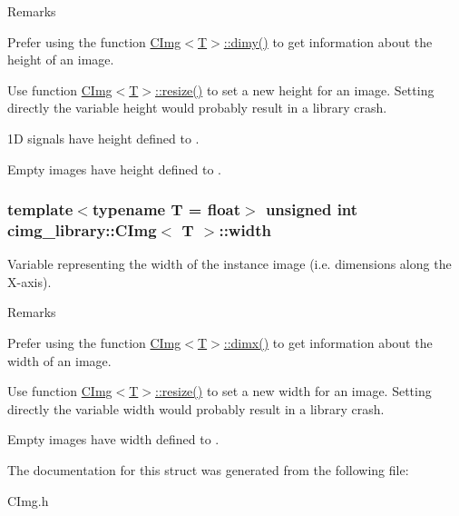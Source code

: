 \begin{DoxyRemark}{Remarks}

\begin{DoxyItemize}
\item Prefer using the function \hyperlink{structcimg__library_1_1_c_img_aa1e128f9d950b39ed312eb368741970c}{C\-Img$<$\-T$>$\-::dimy()} to get information about the height of an image.
\item Use function \hyperlink{structcimg__library_1_1_c_img_a84970d569f01fc5f9370d9cc84428903}{C\-Img$<$\-T$>$\-::resize()} to set a new height for an image. Setting directly the variable {\ttfamily height} would probably result in a library crash.
\item 1\-D signals have {\ttfamily height} defined to {}.
\item Empty images have {\ttfamily height} defined to {}. 
\end{DoxyItemize}
\end{DoxyRemark}
\hypertarget{structcimg__library_1_1_c_img_a5fb74a7776210bb99fd6755319ade13f}{
\subsubsection[{width}]{\setlength{\rightskip}{0pt plus 5cm}template$<$typename T = float$>$ unsigned int {\bf cimg\-\_\-library\-::\-C\-Img}$<$ T $>$\-::width}}\label{structcimg__library_1_1_c_img_a5fb74a7776210bb99fd6755319ade13f}


Variable representing the width of the instance image (i.\-e. dimensions along the X-\/axis). 

\begin{DoxyRemark}{Remarks}

\begin{DoxyItemize}
\item Prefer using the function \hyperlink{structcimg__library_1_1_c_img_abf1a3c383880a20428b2ea9d22f3c06e}{C\-Img$<$\-T$>$\-::dimx()} to get information about the width of an image.
\item Use function \hyperlink{structcimg__library_1_1_c_img_a84970d569f01fc5f9370d9cc84428903}{C\-Img$<$\-T$>$\-::resize()} to set a new width for an image. Setting directly the variable {\ttfamily width} would probably result in a library crash.
\item Empty images have {\ttfamily width} defined to {}. 
\end{DoxyItemize}
\end{DoxyRemark}


The documentation for this struct was generated from the following file\-:\begin{DoxyCompactItemize}
\item 
C\-Img.\-h\end{DoxyCompactItemize}
